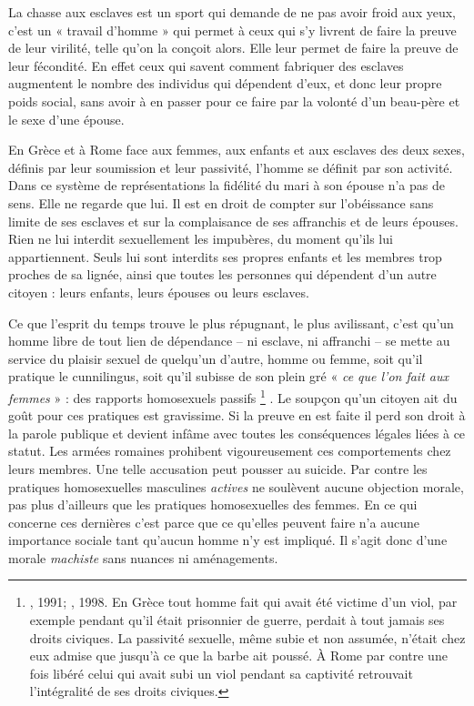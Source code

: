  La chasse aux esclaves est un sport qui demande de ne pas avoir froid aux yeux, c'est un « travail d'homme » qui permet à ceux qui s'y livrent de faire la preuve de leur virilité, telle qu'on la conçoit alors. Elle leur permet de faire la preuve de leur fécondité. En effet ceux qui savent comment fabriquer des esclaves augmentent le nombre des individus qui dépendent d'eux, et donc leur propre poids social, sans avoir à en passer pour ce faire par la volonté d'un beau-père et le sexe d'une épouse. 

 En Grèce et à Rome face aux femmes, aux enfants et aux esclaves des deux sexes, définis par leur soumission et leur passivité, l'homme se définit par son activité. Dans ce système de représentations la fidélité du mari à son épouse n'a pas de sens. Elle ne regarde que lui. Il est en droit de compter sur l'obéissance sans limite de ses esclaves et sur la complaisance de ses affranchis et de leurs épouses. Rien ne lui interdit sexuellement les impubères, du moment qu'ils lui appartiennent. Seuls lui sont interdits ses propres enfants et les membres trop proches de sa lignée, ainsi que toutes les personnes qui dépendent d'un autre citoyen : leurs enfants, leurs épouses ou leurs esclaves.

 Ce que l'esprit du temps trouve le plus répugnant, le plus avilissant, c'est qu'un homme libre de tout lien de dépendance -- ni esclave, ni affranchi -- se mette au service du plaisir sexuel de quelqu'un d'autre, homme ou femme, soit qu'il pratique le cunnilingus, soit qu'il subisse de son plein gré « \emph{ce que l'on fait aux femmes} » : des rapports homosexuels passifs%
\footnote{, 1991; , 1998. En Grèce tout homme fait qui avait été victime d'un viol, par exemple pendant qu'il était prisonnier de guerre, perdait à tout jamais ses droits civiques. La passivité sexuelle, même subie et non assumée, n'était chez eux admise que jusqu'à ce que la barbe ait poussé. À Rome par contre une fois libéré celui qui avait subi un viol pendant sa captivité retrouvait l'intégralité de ses droits civiques.}%
. Le soupçon qu'un citoyen ait du goût pour ces pratiques est gravissime. Si la preuve en est faite il perd son droit à la parole publique et devient infâme avec toutes les conséquences légales liées à ce statut. Les armées romaines prohibent vigoureusement ces comportements chez leurs membres. Une telle accusation peut pousser au suicide. Par contre les pratiques homosexuelles masculines \emph{actives} ne soulèvent aucune objection morale, pas plus d'ailleurs que les pratiques homosexuelles des femmes. En ce qui concerne ces dernières c'est parce que ce qu'elles peuvent faire n'a aucune importance sociale tant qu'aucun homme n'y est impliqué. Il s'agit donc d'une morale \emph{machiste} sans nuances ni aménagements.

